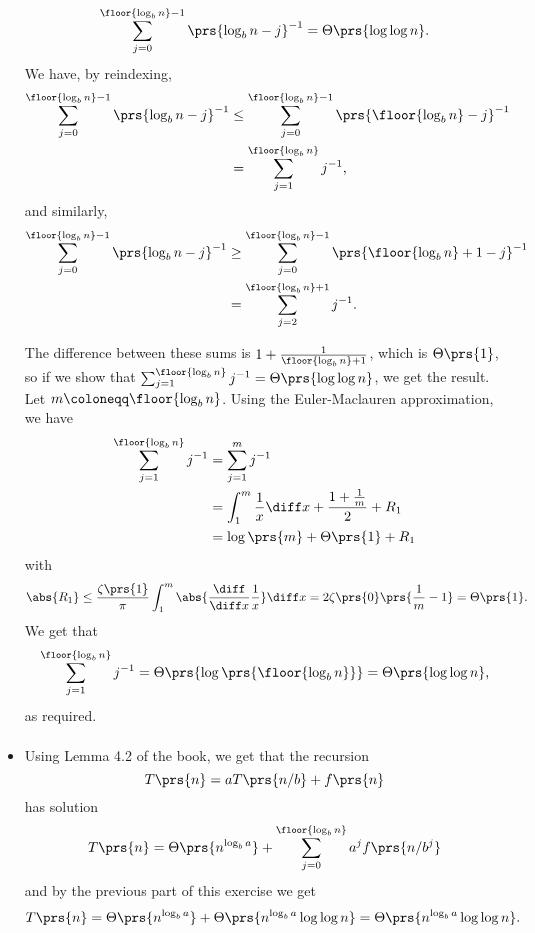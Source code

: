 \documentclass[oneside]{scrbook}
\theoremstyle{definition}
\begin{document}
\begin{exercise}
\begin{itemize}
\begin{align*}
\sum_{j=0}^{\floor{\log_b n} - 1} \prs{\log_b n - j}^{-1} = \Theta\prs{\log \log n} \text{.}
\end{align*}
We have, by reindexing,
\begin{align*}
\sum_{j=0}^{\floor{\log_b n} - 1} \prs{\log_b n - j}^{-1}
&\leq \sum_{j=0}^{\floor{\log_b n} - 1} \prs{\floor{\log_b n} - j}^{-1}
\\&= \sum_{j = 1}^{\floor{\log_b n}} j^{-1} \text{,}
\end{align*}
and similarly,
\begin{align*}
\sum_{j=0}^{\floor{\log_b n} - 1} \prs{\log_b n - j}^{-1}
&\geq \sum_{j=0}^{\floor{\log_b n} - 1} \prs{\floor{\log_b n} + 1 - j}^{-1}
\\&= \sum_{j=2}^{\floor{\log_b n} + 1} j^{-1} \text{.}
\end{align*}

The difference between these sums is $1 + \frac{1}{\floor{\log_b n} + 1}$, which is $\Theta\prs{1}$, so if we show that $\sum_{j=1}^{\floor{\log_b n}} j^{-1} = \Theta\prs{\log \log n}$, we get the result.
Let $m \coloneqq \floor{\log_b n}$. Using the Euler-Maclauren approximation, we have
\begin{align*}
\sum_{j=1}^{\floor{\log_b n}} j^{-1} &= \sum_{j=1}^{m} j^{-1}
\\&= \int_1^m \frac{1}{x} \diff x + \frac{1 + \frac{1}{m}}{2} + R_1
\\&= \log\prs{m} + \Theta\prs{1} + R_1
\end{align*}
with
\[\abs{R_1} \leq \frac{\zeta\prs{1}}{\pi} \int_1^m \abs{ \frac{\diff}{\diff x} \frac{1}{x}} \diff x = 2 \zeta\prs{0} \prs{\frac{1}{m} - 1} = \Theta\prs{1} \text{.}\]
We get that
\[\sum_{j=1}^{\floor{\log_b n}} j^{-1} = \Theta\prs{\log\prs{\floor{\log_b n}}} = \Theta\prs{\log \log n} \text{,}\]
as required.
\begin{align*}
\end{align*}

\item Using Lemma 4.2 of the book, we get that the recursion
\[T\prs{n} = a T\prs{n/b} + f\prs{n}\]
has solution
\[T\prs{n} = \Theta\prs{n^{\log_b a}} + \sum_{j=0}^{\floor{\log_b n}} a^j f\prs{n/b^j}\]
and by the previous part of this exercise we get
\[T\prs{n} = \Theta\prs{n^{\log_b a}} + \Theta\prs{n^{\log_b a} \log \log n} = \Theta\prs{n^{\log_b a} \log \log n} \text{.}\]
\end{itemize}
\end{exercise}
\end{document}
